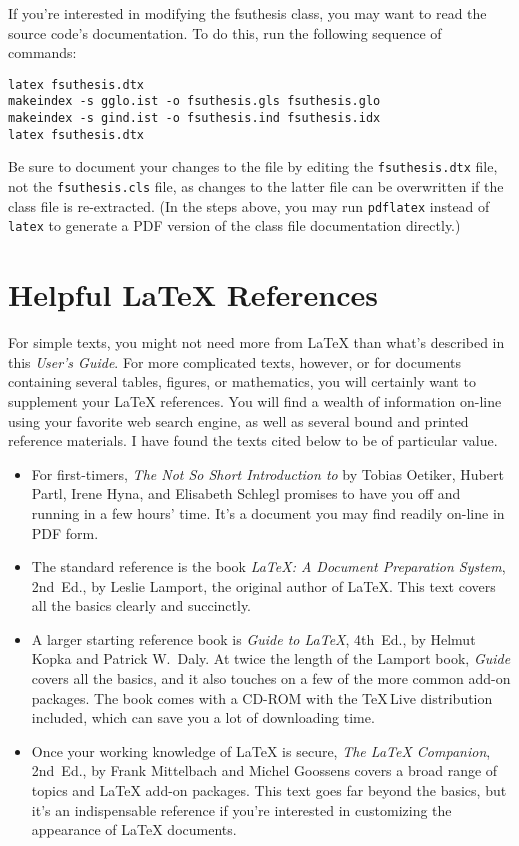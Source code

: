\documentclass[11pt,letterpaper]{article}
\newcommand*{\acro}[1]{{\small\textsc{#1}}}
\newcommand*{\booktitle}[1]{\textit{#1}}
\newcommand*{\complit}[1]{\texttt{#1}}
\newcommand*{\latexclass}[1]{\textsf{#1}}
\newcommand*{\fsuth}{\latexclass{fsuthesis}}
\renewcommand{\-}{\discretionary{}{}{}}
\begin{document}
If you're interested in modifying the \fsuth{} class, you may want to
read the source code's documentation.  To do this, run the following
sequence of commands:
\begin{verbatim}
latex fsuthesis.dtx 
makeindex -s gglo.ist -o fsuthesis.gls fsuthesis.glo
makeindex -s gind.ist -o fsuthesis.ind fsuthesis.idx
latex fsuthesis.dtx 
\end{verbatim}
Be sure to document your changes to the file by editing the
\complit{fsuthesis.dtx} file, not the \complit{fsuthesis.cls} file, as
changes to the latter file can be overwritten if the class file is
re-extracted.  (In the steps above, you may run \complit{pdflatex}
instead of \complit{latex} to generate a \acro{PDF} version of the class file
documentation directly.)

\section{Helpful \LaTeX{} References}

For simple texts, you might not need more from \LaTeX{} than what's
described in this \booktitle{User's Guide}.  For more complicated
texts, however, or for documents containing several tables, figures,
or mathematics, you will certainly want to supplement your \LaTeX{}
references.  You will find a wealth of information on-line using your
favorite web search engine, as well as several bound and printed
reference materials.  I have found the texts cited below to be of
particular value.
\begin{itemize}
\item
For first-timers, \booktitle{The Not So Short Introduction to \LaTeXe}
by Tobias Oetiker, Hubert Partl, Irene Hyna, and Elisabeth Schlegl
promises to have you off and running in a few hours' time.  It's a
document you may find readily on-line in \acro{PDF} form.

\item
The standard reference is the book \booktitle{\LaTeX: A Document
  Preparation System}, 2nd~Ed., by Leslie Lamport, the original author
of \LaTeX{}.  This text covers all the basics clearly and succinctly.

\item
A larger starting reference book is \booktitle{Guide to \LaTeX},
4th~Ed., by Helmut Kopka and Patrick W.~Daly.  At twice the length of
the Lamport book, \booktitle{Guide} covers all the basics, and it also
touches on a few of the more common add-on packages.  The book
comes with a CD-ROM with the \TeX\,Live distribution included, which
can save you a lot of downloading time.

\item
Once your working knowledge of \LaTeX{} is secure, \booktitle{The
  \LaTeX{} Companion}, 2nd~Ed., by Frank Mittelbach and Michel
Goossens covers a broad range of topics and \LaTeX{} add-on packages.
This text goes far beyond the basics, but it's an indispensable
reference if you're interested in customizing the appearance of
\LaTeX{} documents.
\end{itemize}
\end{document}
